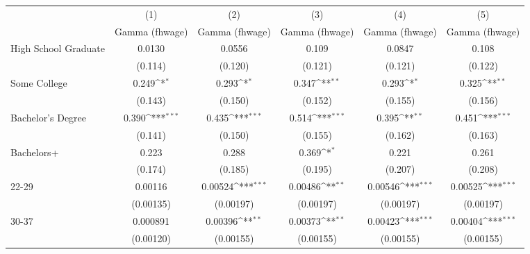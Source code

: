 {
\def\sym#1{\ifmmode^{#1}\else\(^{#1}\)\fi}
\begin{tabular}{l*{5}{c}}
\hline\hline
                    &\multicolumn{1}{c}{(1)}&\multicolumn{1}{c}{(2)}&\multicolumn{1}{c}{(3)}&\multicolumn{1}{c}{(4)}&\multicolumn{1}{c}{(5)}\\
                    &\multicolumn{1}{c}{Gamma (fhwage)}&\multicolumn{1}{c}{Gamma (fhwage)}&\multicolumn{1}{c}{Gamma (fhwage)}&\multicolumn{1}{c}{Gamma (fhwage)}&\multicolumn{1}{c}{Gamma (fhwage)}\\
\hline
High School Graduate&      0.0130         &      0.0556         &       0.109         &      0.0847         &       0.108         \\
                    &     (0.114)         &     (0.120)         &     (0.121)         &     (0.121)         &     (0.122)         \\
[1em]
Some College        &       0.249\sym{*}  &       0.293\sym{*}  &       0.347\sym{**} &       0.293\sym{*}  &       0.325\sym{**} \\
                    &     (0.143)         &     (0.150)         &     (0.152)         &     (0.155)         &     (0.156)         \\
[1em]
Bachelor's Degree   &       0.390\sym{***}&       0.435\sym{***}&       0.514\sym{***}&       0.395\sym{**} &       0.451\sym{***}\\
                    &     (0.141)         &     (0.150)         &     (0.155)         &     (0.162)         &     (0.163)         \\
[1em]
Bachelors+          &       0.223         &       0.288         &       0.369\sym{*}  &       0.221         &       0.261         \\
                    &     (0.174)         &     (0.185)         &     (0.195)         &     (0.207)         &     (0.208)         \\
[1em]
22-29               &     0.00116         &     0.00524\sym{***}&     0.00486\sym{**} &     0.00546\sym{***}&     0.00525\sym{***}\\
                    &   (0.00135)         &   (0.00197)         &   (0.00197)         &   (0.00197)         &   (0.00197)         \\
[1em]
30-37               &    0.000891         &     0.00396\sym{**} &     0.00373\sym{**} &     0.00423\sym{***}&     0.00404\sym{***}\\
                    &   (0.00120)         &   (0.00155)         &   (0.00155)         &   (0.00155)         &   (0.00155)         \\

\end{tabular}}
